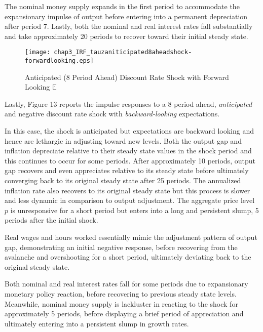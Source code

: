 \documentclass[12pt]{article}
\newcommand{\1}{\mathbbm 1}
\begin{document}
The nominal money supply expands in the first period to accommodate the expansionary impulse of output before entering into a permanent depreciation after period 7. Lastly, both the nominal and real interest rates fall substantially and take approximately 20 periods to recover toward their initial steady state. 







 



\begin{figure}[H]
	\begin{center}
		\texttt{[image: chap3\_IRF\_tauzaniticipated8aheadshock-forwardlooking.eps]}
	\end{center}
	\caption{Anticipated (8 Period Ahead) Discount Rate Shock with Forward Looking $\mathbb{E}$}
\end{figure}



Lastly, Figure 13 reports the impulse responses to a 8 period ahead, \textit{anticipated} and negative discount rate shock with \textit{backward-looking} expectations. 

In this case, the shock is anticipated but expectations are backward looking and hence are lethargic in adjusting toward new levels. Both the output gap and inflation depreciate relative to their steady state values in the shock period and this continues to occur for some periods. After approximately 10 periods, output gap recovers and even appreciates relative to its steady state before ultimately converging back to its original steady state after 25 periods. The annualized inflation rate also recovers to its original steady state but this process is slower and less dynamic in comparison to output adjustment. The aggregate price level $p$ is unresponsive for a short period but enters into a long and persistent slump, 5 periods after the initial shock.

Real wages and hours worked essentially mimic the adjustment pattern of output gap, demonstrating an initial negative response, before recovering from the avalanche and overshooting for a short period, ultimately deviating back to the original steady state.


Both nominal and real interest rates fall for some periods due to expansionary monetary policy reaction, before recovering to previous steady state levels. Meanwhile, nominal money supply is lackluster in reacting to the shock for approximately 5 periods, before displaying a brief period of appreciation and ultimately entering into a persistent slump in growth rates.
\end{document}

